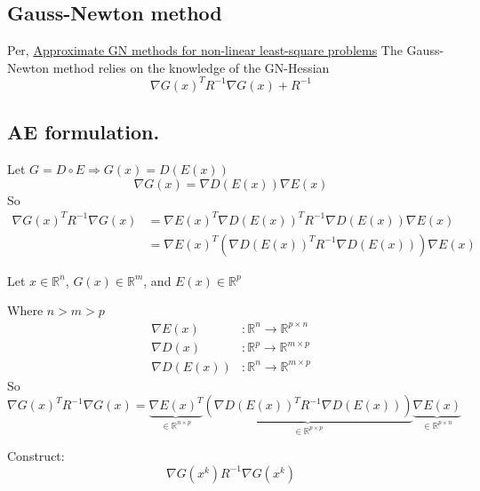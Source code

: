 \documentclass[11pt]{article}
\begin{document}
\subsection{Gauss-Newton method}
\label{sec:orgee34333}
Per, \href{../20220117085304-approximati_gn_methods_for_non_linear_least_square_problems.org}{Approximate GN methods for non-linear least-square problems} The
Gauss-Newton method relies on the knowledge of the GN-Hessian
\begin{equation}
\nabla G(x)^T R^{-1} \nabla G(x) + R^{-1}
\end{equation}


\subsection{AE formulation.}
\label{sec:org9efa493}
Let \(G = D \circ E \Rightarrow G(x) = D(E(x))\)
\begin{equation}
\nabla G(x) = \nabla D(E(x))\nabla E(x)
\end{equation}
So
\begin{align}
\nabla G(x)^T R^{-1} \nabla G(x) &=  \nabla E(x) ^T \nabla D(E(x))^T R^{-1}\nabla D(E(x))\nabla E(x)\\
&=  \nabla E(x) ^T \left(\nabla D(E(x))^T R^{-1}\nabla D(E(x))\right)\nabla E(x)
\end{align}

Let \(x \in \mathbb{R}^n\), \(G(x) \in \mathbb{R}^m\), and \(E(x) \in \mathbb{R}^{p}\)

Where \(n > m > p\)
\begin{align}
\nabla E(x)&: \mathbb{R}^n \rightarrow \mathbb{R}^{p \times n} \\
\nabla D(x)&: \mathbb{R}^p \rightarrow \mathbb{R}^{m \times p} \\
\nabla D(E(x)) &: \mathbb{R}^n \rightarrow \mathbb{R}^{m \times p}
\end{align}
So
\begin{equation}
\nabla G(x)^T R^{-1} \nabla G(x) = \underbrace{\nabla E(x)^T}_{\in \mathbb{R}^{n \times p}} \underbrace{\left(\nabla D(E(x))^T R^{-1}\nabla D(E(x))\right)}_{\in\mathbb{R}^{p \times p}}\underbrace{\nabla E(x)}_{\in\mathbb{R}^{p \times n}}
\end{equation}



Construct:
\begin{equation}
\nabla G(x^k) R^{-1} \nabla G(x^k)
\end{equation}




\end{document}
